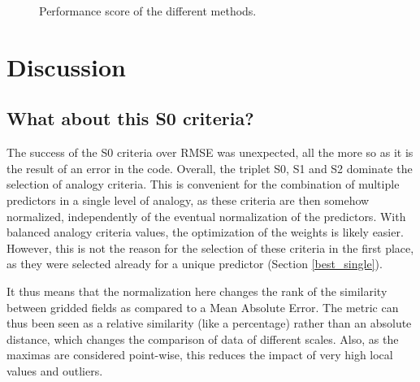 \documentclass[draft]{agujournal2019}
\begin{document}
\begin{figure}[hbt]
	\noindent{}
	\caption{Performance score of the different methods.}
	\label{fig_scores}
\end{figure}


\section{Discussion}
\label{discussion}

\subsection{What about this S0 criteria?}
\label{discussion_S0}

The success of the S0 criteria over RMSE was unexpected, all the more so as it is the result of an error in the code. Overall, the triplet S0, S1 and S2 dominate the selection of analogy criteria. This is convenient for the combination of multiple predictors in a single level of analogy, as these criteria are then somehow normalized, independently of the eventual normalization of the predictors. With balanced analogy criteria values, the optimization of the weights is likely easier. However, this is not the reason for the selection of these criteria in the first place, as they were selected already for a unique predictor (Section \ref{best_single}). 

It thus means that the normalization here changes the rank of the similarity between gridded fields as compared to a Mean Absolute Error. The metric can thus been seen as a relative similarity (like a percentage) rather than an absolute distance, which changes the comparison of data of different scales. Also, as the maximas are considered point-wise, this reduces the impact of very high local values and outliers.
\end{document}
